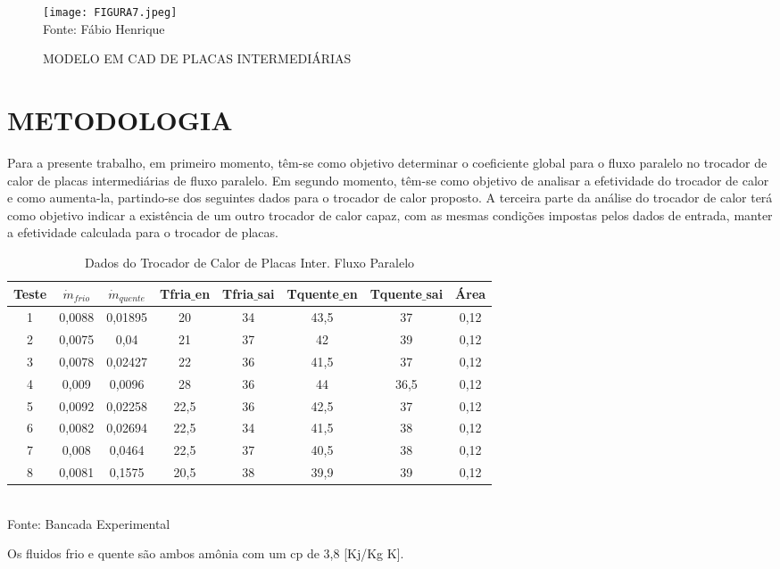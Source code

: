 \documentclass[a4paper,12pt,oneside]{article}
\begin{document}
\begin{flushright}
\begin{figure}[h]
	\centering
	\caption{MODELO EM CAD DE PLACAS INTERMEDIÁRIAS }
	\vspace{0.5cm}
	\texttt{[image: FIGURA7.jpeg]}
	\vspace{0.5cm}\\
	Fonte: Fábio Henrique
\end{figure}
\vspace{0.5cm}

\pagebreak
\clearpage
\newpage
\section{\large METODOLOGIA}
\vspace{0.5cm}

Para a presente trabalho, em primeiro momento, têm-se como objetivo determinar o coeficiente global para o fluxo paralelo no trocador de calor de placas intermediárias de fluxo paralelo. Em segundo momento, têm-se como objetivo de analisar a efetividade do trocador de calor e como aumenta-la, partindo-se dos seguintes dados para o trocador de calor proposto. A terceira parte da análise do trocador de calor terá como objetivo indicar a existência de um outro trocador de calor capaz, com as mesmas condições impostas pelos dados de entrada, manter a efetividade calculada para o trocador de placas.\\

\begin{table}[h]
	\caption{Dados do Trocador de Calor de Placas Inter. Fluxo Paralelo}
	\vspace{0.8cm}
	\centering
	\begin{tabular}{| c | c | c | c | c | c | c | c |}
		\hline
		Teste & $\dot{m}_{frio}$ & $\dot{m}_{quente}$&Tfria$\_$en& Tfria$\_$sai& Tquente$\_$en& Tquente$\_$sai& Área\\
		\hline
			1 & 0,0088 & 0,01895  & 20& 34& 43,5& 37&0,12\\
		\hline
			2 & 0,0075 & 0,04  & 21& 37& 42& 39& 0,12\\
		\hline
			3 & 0,0078 & 0,02427  & 22& 36& 41,5& 37& 0,12\\
		\hline
			4 & 0,009 & 0,0096  & 28& 36& 44& 36,5& 0,12\\
		\hline
			5 & 0,0092 & 0,02258  & 22,5& 36& 42,5& 37& 0,12\\
		\hline
			6 & 0,0082 & 0,02694  & 22,5& 34& 41,5& 38& 0,12\\
		\hline
			7 & 0,008 & 0,0464  & 22,5& 37& 40,5& 38& 0,12\\
		\hline
			8 & 0,0081 & 0,1575  & 20,5& 38& 39,9& 39& 0,12\\
		\hline
	\end{tabular}\\
	\vspace{0.8cm}
	Fonte: Bancada Experimental
	\vspace{1cm}
\end{table}
\pagebreak
\clearpage
\newpage
Os fluidos frio e quente são ambos amônia com um cp de 3,8 [Kj/Kg K].



\end{flushright}
\end{document}
